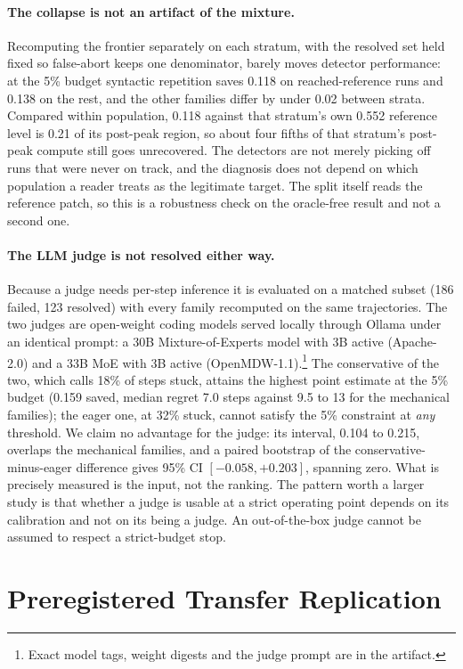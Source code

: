 \documentclass[sigconf,screen]{acmart}
\begin{document}
\paragraph{The collapse is not an artifact of the mixture.} Recomputing the frontier separately on
each stratum, with the resolved set held fixed so false-abort keeps one denominator, barely moves
detector performance: at the 5\% budget syntactic repetition saves 0.118 on reached-reference runs
and 0.138 on the rest, and the other families differ by under 0.02 between strata. Compared within
population, 0.118 against that stratum's own 0.552 reference level is 0.21 of its post-peak
region, so about four fifths of that stratum's post-peak compute still goes unrecovered.
The detectors are not merely picking off runs that were never on track, and the diagnosis does not
depend on which population a reader treats as the legitimate target. The split itself reads the
reference patch, so this is a robustness check on the oracle-free result and not a second one.

\paragraph{The LLM judge is not resolved either way.} Because a judge needs per-step inference it is
evaluated on a matched subset (186 failed, 123 resolved) with every family recomputed on the same
trajectories. The two judges are open-weight coding models served locally through Ollama under an
identical prompt: a 30B Mixture-of-Experts model with 3B active (Apache-2.0) and a 33B MoE with 3B
active (OpenMDW-1.1).\footnote{Exact model tags, weight digests and the judge prompt are in the
artifact.} The conservative of the two, which
calls 18\% of steps stuck, attains the highest point estimate at the 5\% budget (0.159 saved, median
regret 7.0 steps against 9.5 to 13 for the mechanical families); the eager one, at 32\% stuck, cannot
satisfy the 5\% constraint at \emph{any} threshold. We claim no advantage for the judge: its
interval, 0.104 to 0.215, overlaps the mechanical families, and a paired bootstrap of the
conservative-minus-eager difference gives 95\% CI $[-0.058, +0.203]$, spanning zero. What is
precisely measured is the input, not the ranking. The pattern worth a larger study is that whether a
judge is usable at a strict operating point depends on its calibration and not
on its being a judge. An out-of-the-box judge cannot be assumed to respect a strict-budget
stop.

\section{Preregistered Transfer Replication}
\label{sec:transfer}
\end{document}
